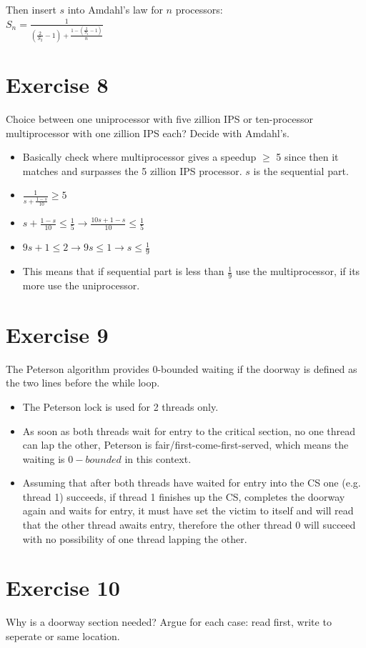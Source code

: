 \documentclass[a4paper,%
11pt,%
DIV=14,
headsepline,%
headings=normal,
]{scrartcl}
\newcommand{\exercise}[1]{\section*{Exercise #1}}
\begin{document}
Then insert $s$ into Amdahl's law for $n$ processors:\\
$S_n = \frac{1}{(\frac{2}{S_2}-1)+\frac{1-(\frac{2}{S_2}-1)}{n}}$

\exercise{8}
Choice between one uniprocessor with five zillion IPS or ten-processor multiprocessor with one zillion IPS each? Decide with Amdahl's.

\begin{itemize}
\item Basically check where multiprocessor gives a speedup $\geq$ 5 since then it matches and surpasses the 5 zillion IPS processor. $s$ is the sequential part.
\item $\frac{1}{s+\frac{1-s}{10}} \geq 5$
\item $s+\frac{1-s}{10} \leq \frac{1}{5} \rightarrow \frac{10s+1-s}{10} \leq \frac{1}{5}$
\item $ 9s+1 \leq 2 \rightarrow 9s \leq 1 \rightarrow s \leq \frac{1}{9}$
\item This means that if sequential part is less than $\frac{1}{9}$ use the multiprocessor, if its more use the uniprocessor.
\end{itemize}

\exercise{9}

The Peterson algorithm provides 0-bounded waiting if the doorway is defined as the two lines before the while loop.
\begin{itemize}
\item The Peterson lock is used for 2 threads only.
\item As soon as both threads wait for entry to the critical section, no one thread can lap the other, Peterson is fair/first-come-first-served, which means the waiting is $0-bounded$ in this context.
\item Assuming that after both threads have waited for entry into the CS one (e.g. thread 1) succeeds, if thread 1 finishes up the CS, completes the doorway again and waits for entry, it must have set the victim to itself and will read that the other thread awaits entry, therefore the other thread 0 will succeed with no possibility of one thread lapping the other.
\end{itemize}

\exercise{10}

Why is a doorway section needed? Argue for each case: read first, write to seperate or same location.
\end{document}
